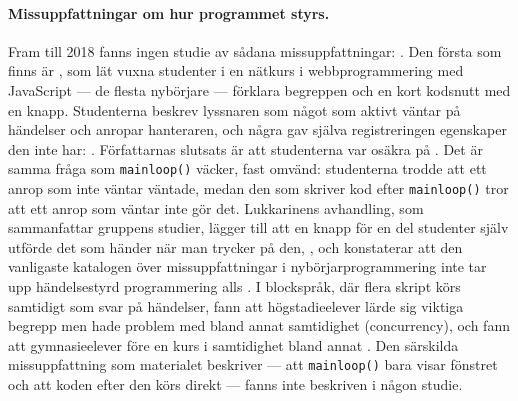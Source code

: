 \paragraph{Missuppfattningar om hur programmet styrs.}  Fram till 2018
fanns ingen studie av sådana missuppfattningar:
.  Den första som finns är
\textcite{Lukkarinen2021Listener}, som lät vuxna studenter i en
nätkurs i webbprogrammering med JavaScript --- de flesta nybörjare ---
förklara begreppen och en kort kodsnutt med en knapp.  Studenterna
beskrev lyssnaren som något som aktivt väntar på händelser och anropar
hanteraren, och några gav själva registreringen egenskaper den inte har:
.  Författarnas slutsats
är att studenterna var osäkra på
.  Det är samma fråga som
\texttt{mainloop()} väcker, fast omvänd: studenterna trodde
att ett anrop som inte väntar väntade, medan den som skriver kod efter
\texttt{mainloop()} tror att ett anrop som väntar inte gör
det.  Lukkarinens avhandling, som sammanfattar gruppens studier, lägger
till att en knapp för en del studenter själv utförde det som händer när
man trycker på den,
, och konstaterar att den vanligaste
katalogen över missuppfattningar i nybörjarprogrammering inte tar upp
händelsestyrd programmering alls
\autocite[19]{Lukkarinen2022Thesis}.  I blockspråk, där flera skript
körs samtidigt som svar på händelser, fann
\textcite{MeerbaumSalant2013} att högstadieelever lärde sig viktiga
begrepp men hade problem med bland annat samtidighet
(\foreignlanguage{english}{concurrency}), och \textcite{Kolikant2001}
fann att gymnasieelever före en kurs i samtidighet bland annat
.  Den särskilda missuppfattning som materialet beskriver ---
att \texttt{mainloop()} bara visar fönstret och att koden
efter den körs direkt --- fanns inte beskriven i någon studie.

